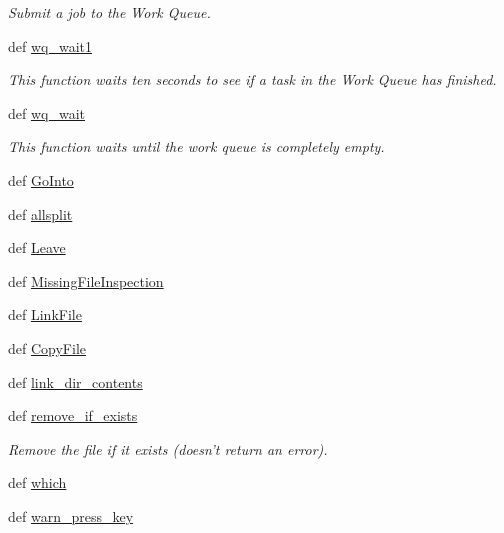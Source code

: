 \begin{DoxyCompactItemize}
\begin{DoxyCompactList}\small\item\em \-Submit a job to the \-Work \-Queue. \end{DoxyCompactList}\item 
def \hyperlink{namespaceforcebalance_1_1nifty_a374aac2ef003be02fab49b20ff0a82f0}{wq\-\_\-wait1}
\begin{DoxyCompactList}\small\item\em \-This function waits ten seconds to see if a task in the \-Work \-Queue has finished. \end{DoxyCompactList}\item 
def \hyperlink{namespaceforcebalance_1_1nifty_a576de8c5b6f236280e07e73e39b2ab7c}{wq\-\_\-wait}
\begin{DoxyCompactList}\small\item\em \-This function waits until the work queue is completely empty. \end{DoxyCompactList}\item 
def \hyperlink{namespaceforcebalance_1_1nifty_ad432b88307e1178b0690c0d350b1af36}{\-Go\-Into}
\item 
def \hyperlink{namespaceforcebalance_1_1nifty_ac9ab6c5543a2e3080061e0024850edf3}{allsplit}
\item 
def \hyperlink{namespaceforcebalance_1_1nifty_ab04e8690d099db2379dc860e0d040120}{\-Leave}
\item 
def \hyperlink{namespaceforcebalance_1_1nifty_ae87c7def5f8edf2ec30737bdb1d2636f}{\-Missing\-File\-Inspection}
\item 
def \hyperlink{namespaceforcebalance_1_1nifty_ab182a9da2a2f42cf45942fbee6acf9b1}{\-Link\-File}
\item 
def \hyperlink{namespaceforcebalance_1_1nifty_af5f0e1ba7689f1ab40383ba0480560a9}{\-Copy\-File}
\item 
def \hyperlink{namespaceforcebalance_1_1nifty_a0cf4e58f90acf20e3d6224be2354082c}{link\-\_\-dir\-\_\-contents}
\item 
def \hyperlink{namespaceforcebalance_1_1nifty_a25efa4d501ad852a234721af18978f7e}{remove\-\_\-if\-\_\-exists}
\begin{DoxyCompactList}\small\item\em \-Remove the file if it exists (doesn't return an error). \end{DoxyCompactList}\item 
def \hyperlink{namespaceforcebalance_1_1nifty_aa1ff334c4b4e30e91978b91d9a9ec065}{which}
\item 
def \hyperlink{namespaceforcebalance_1_1nifty_abb8f59044961a12588e0653c2baa8b01}{warn\-\_\-press\-\_\-key}

\end{DoxyCompactItemize}
